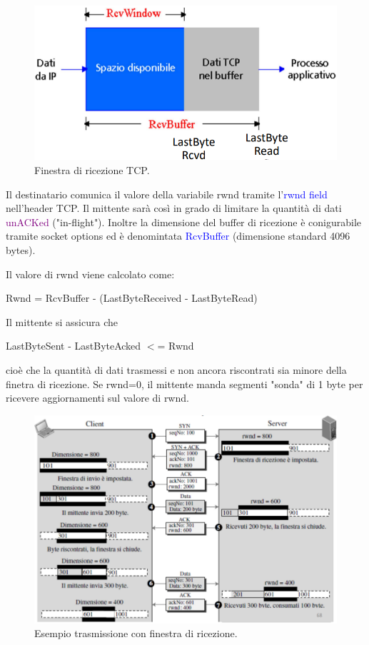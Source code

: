 \begin{figure}[h]
    \centering
    \includegraphics[scale=0.35]{Immagini/FinestraDiRicezioneTCP.png}
    \caption{Finestra di ricezione TCP.}
\end{figure}

Il destinatario comunica il valore della variabile rwnd tramite l'\textcolor{blue}{rwnd field} nell'header TCP. 
Il mittente sarà così in grado di limitare la quantità di dati \textcolor{purple}{unACKed} ("in-flight").
Inoltre la dimensione del buffer di ricezione è conigurabile tramite socket options ed è denomintata \textcolor{blue}{RcvBuffer} (dimensione standard 4096 bytes).

Il valore di rwnd viene calcolato come:
\begin{center}
    Rwnd = RcvBuffer - (LastByteReceived - LastByteRead)
\end{center}
\newpage
Il mittente si assicura che
\begin{center}
    LastByteSent - LastByteAcked $<$= Rwnd
\end{center}
cioè che la quantità di dati trasmessi e non ancora riscontrati sia minore della finetra di ricezione.
Se rwnd=0, il mittente manda segmenti "sonda" di 1 byte per ricevere aggiornamenti sul valore di rwnd.

\begin{figure}[h]
    \centering
    \includegraphics[scale=0.45]{Immagini/TCPEsempioTrasmissioneFinestraDiRicezione.png}
    \caption{Esempio trasmissione con finestra di ricezione.}
\end{figure}


